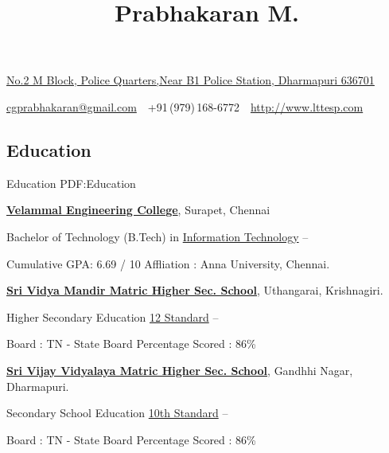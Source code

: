 \documentclass[letterpaper,MMMyyyy,nonstop]{simpleresumecv}
\newcommand{\CVAuthor}{Prabhakaran M.}
\newcommand{\CVWebpage}{http://www.lttesp.com}
\begin{document}

\title{\CVAuthor}

\begin{subtitle}
\href{https://www.google.com/maps/place/17+Prime+Avenue,+Springfield,+Pennsylvania+10111,+USA}
{No.2 M Block, Police Quarters,Near B1 Police Station, Dharmapuri 636701}
\par
\href{mailto:cgprabhakaran@gmail.com}
{cgprabhakaran@gmail.com}
\,\SubBulletSymbol\,
+91\,(979)\,168-6772
\,\SubBulletSymbol\,
\href{\CVWebpage}
{\CVWebpage}
\end{subtitle}

\begin{body}


\section
{Education}
{Education}
{PDF:Education}

\href{http://www.velammal.edu.in}
{\textbf{Velammal Engineering College}},
Surapet, Chennai

\GapNoBreak
\BulletItem
Bachelor of Technology (B.Tech) in
\href{http://www.example.com/my-department}
{Information Technology}
\hfill
{} --
\begin{detail}
\SubBulletItem
Cumulative GPA: 6.69 / 10
\SubBulletItem 
Affliation : Anna University, Chennai.
\end{detail}

\BigGap
\href{https://www.google.co.in/#q=sri+vidya+mandir+uthangarai}
{\textbf{Sri Vidya Mandir Matric Higher Sec. School}},
Uthangarai, Krishnagiri.

\GapNoBreak
\BulletItem
Higher Secondary Education 
\href{http://www.example.com/my-department}
{12 Standard}
\hfill
{} --
\begin{detail}
\SubBulletItem
Board : TN - State Board
\SubBulletItem
Percentage Scored : 86\%
\end{detail}

\BigGap
\href{http://www.vijayvidyalaya.com/matric_dhar/}
{\textbf{Sri Vijay Vidyalaya Matric Higher Sec. School}},
Gandhhi Nagar, Dharmapuri.

\GapNoBreak
\BulletItem
Secondary School Education 
\href{}
{10th Standard}
\hfill
{} --
\begin{detail}
\SubBulletItem
Board : TN - State Board
\SubBulletItem
Percentage Scored : 86\%
\end{detail}


\end{body}
\end{document}
